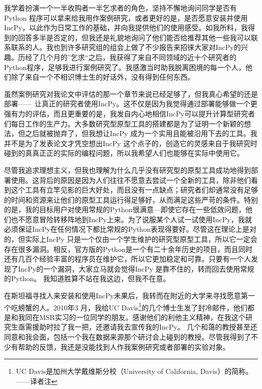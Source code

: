 \documentclass[letter,12pt]{book}
\begin{document}
\begin{CJK}{UTF8}{gbsn}
我学着扮演一个一半收购者一半乞求者的角色，坚持不懈地询问同学是否有Python 程序可以拿来给我用作案例研究，或者更好的是，是否愿意安装并使用IncPy，以此作为日常工作的基础，并向我提供他们的使用感受。如我所料，我得到的回答多半是否定的，但我还是礼貌地询问了他们能否给推荐其他一些我可以联系联系的人。我也到许多研究组的组会上做了不少报告来招徕大家对IncPy的兴趣。历经了几个月的”乞求“之后，我获得了来自不同领域的近十个研究者的Python程序，足够我进行案例研究了。我感激当时助我脱离困境的每一个人，他们除了来自一个不相识博士生的好话外，没有得到任何东西。

\breakline

虽然案例研究对我论文中评估的那一个章节来说已经足够了，但我真心希望的还是部署—— 让真正的研究者使用IncPy。这不仅是因为我觉得通过部署能够做一个更强有力的评估，而且更重要的是，我发自内心地相信IncPy可以提升计算型研究者们每日工作的生产力。大多数研究型原型工具的搭建都是为了证明一个新颖的想法，但之后就被抛弃了，但我想让IncPy 成为一个实用且能被沿用下去的工具。我并不是为了发表论文才凭空想出IncPy 这个点子的，创造它的灵感来自于我研究时碰到的真真正正的实际的编程问题，所以我希望人们也能够在实际中使用它。

尽管我追求理想主义，但我也理解为什么几乎没有研究型的原型工具成功地得到部署使用。这背后的原因是因为人们往往不愿意去尝试一个全新的工具，除非他们看到这个工具有立竿见影的巨大好处，而且没有一点缺点；研究者们却通常没有足够的时间和资源来让他们的原型工具运行得足够好，从而满足这些严苛的条件。特别的是，我的目标用户对使用常规的Python很满意—即使它存在一些低效问题，他们也不愿意冒险转移阵地到IncPy上来。为了说服某个人试一试使用IncPy，我就必须保证IncPy在任何情况下都比常规的Python表现得要好。尽管这在理论上是对的，但实际上IncPy 只是一个仅由一个学生维护的研究型原型工具，所以它一定会存在很多漏洞。相反，官方版的Python是一个有二十余年历史的项目，而且同时还有几百个经验丰富的程序员在维护它，所以它更加稳定和可靠。只要有一个人发现了IncPy的一个漏洞，大家立马就会觉得IncPy 是靠不住的，转而回去使用常规的Python。 我知道胜算不站在我这边，但我不在意。

在斯坦福寻找人来安装和使用IncPy未果后，我转而在附近的大学来寻找愿意第一个吃螃蟹的人。2010年3 月，我给UC Davis\footnote{UC Davis是加州大学戴维斯分校（University of California, Davis）的简称。——译者注}的几个博士生发了封冷邮件，他们都是和我同在MSR实习的一位同学的朋友。感谢他们的利他主义精神，在我这个研究生亟需援助时拉了我一把，还邀请我去宣传我的IncPy。 几个和蔼的教授甚至还同意和我会面，包括一个我在数据来源那个研讨会上碰到的教授。尽管我得到了不少有帮助的反馈，我还是没能找到人作我案例研究或者部署的实验对象。


\end{CJK}
\end{document}
